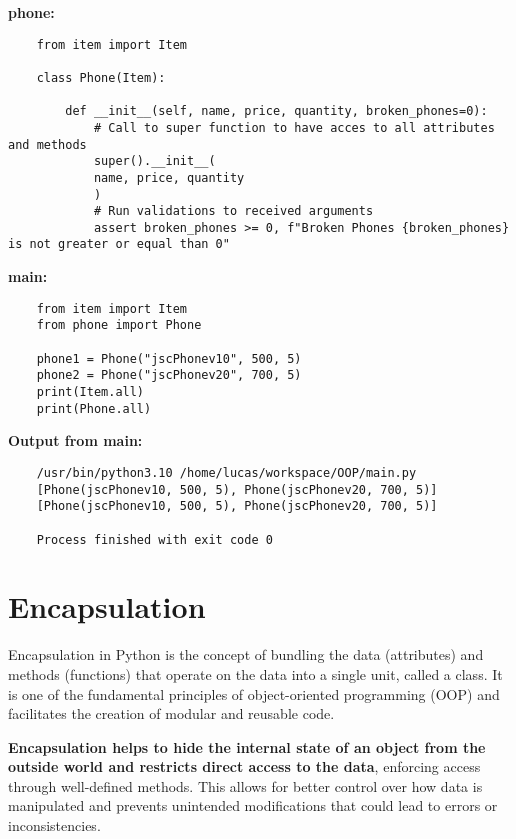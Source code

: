 \documentclass{article}
\begin{document}
\textbf{phone:}

\begin{lstlisting}
	from item import Item
	
	class Phone(Item):
		
		def __init__(self, name, price, quantity, broken_phones=0):
			# Call to super function to have acces to all attributes and methods
			super().__init__(
			name, price, quantity
			)
			# Run validations to received arguments
			assert broken_phones >= 0, f"Broken Phones {broken_phones} is not greater or equal than 0"
\end{lstlisting}

\textbf{main:}
\begin{lstlisting}
	from item import Item
	from phone import Phone
	
	phone1 = Phone("jscPhonev10", 500, 5)
	phone2 = Phone("jscPhonev20", 700, 5)
	print(Item.all)
	print(Phone.all)
\end{lstlisting}

\textbf{Output from main:}

\begin{lstlisting}
	/usr/bin/python3.10 /home/lucas/workspace/OOP/main.py 
	[Phone(jscPhonev10, 500, 5), Phone(jscPhonev20, 700, 5)]
	[Phone(jscPhonev10, 500, 5), Phone(jscPhonev20, 700, 5)]
	
	Process finished with exit code 0
\end{lstlisting}

\section{Encapsulation}

Encapsulation in Python is the concept of bundling the data (attributes) and methods (functions) that operate on the data into a single unit, called a class. It is one of the fundamental principles of object-oriented programming (OOP) and facilitates the creation of modular and reusable code.

\textbf{Encapsulation helps to hide the internal state of an object from the outside world and restricts direct access to the data}, enforcing access through well-defined methods. This allows for better control over how data is manipulated and prevents unintended modifications that could lead to errors or inconsistencies.
\end{document}

